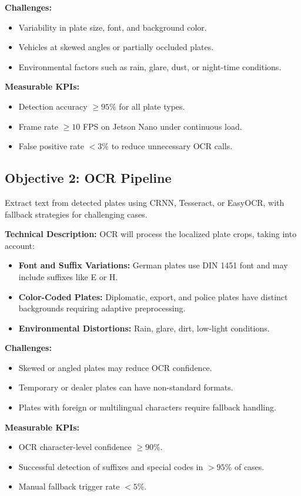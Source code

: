 	\textbf{Challenges:}  
	\begin{itemize}
		\item Variability in plate size, font, and background color.
		\item Vehicles at skewed angles or partially occluded plates.
		\item Environmental factors such as rain, glare, dust, or night-time conditions.
	\end{itemize}
	
	\textbf{Measurable KPIs:}  
	\begin{itemize}
		\item Detection accuracy $\geq 95\%$ for all plate types.
		\item Frame rate $\geq 10$ FPS on Jetson Nano under continuous load.
		\item False positive rate $< 3\%$ to reduce unnecessary OCR calls.
	\end{itemize}
	
	\subsection{Objective 2: OCR Pipeline}
	Extract text from detected plates using CRNN, Tesseract, or EasyOCR, with fallback strategies for challenging cases.
	
	\textbf{Technical Description:}  
	OCR will process the localized plate crops, taking into account:
	\begin{itemize}
		\item \textbf{Font and Suffix Variations:} German plates use DIN 1451 font and may include suffixes like E or H.
		\item \textbf{Color-Coded Plates:} Diplomatic, export, and police plates have distinct backgrounds requiring adaptive preprocessing.
		\item \textbf{Environmental Distortions:} Rain, glare, dirt, low-light conditions.
	\end{itemize}
	
	\textbf{Challenges:}  
	\begin{itemize}
		\item Skewed or angled plates may reduce OCR confidence.
		\item Temporary or dealer plates can have non-standard formats.
		\item Plates with foreign or multilingual characters require fallback handling.
	\end{itemize}
	
	\textbf{Measurable KPIs:}  
	\begin{itemize}
		\item OCR character-level confidence $\geq 90\%$.
		\item Successful detection of suffixes and special codes in $> 95\%$ of cases.
		\item Manual fallback trigger rate $< 5\%$.
	\end{itemize}
	
